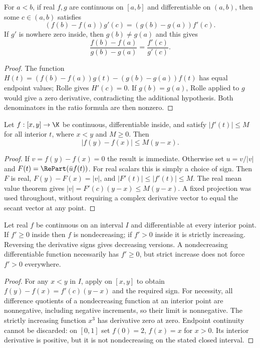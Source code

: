 \begin{theorem}
For $a<b$, if real $f,g$ are continuous on $[a,b]$ and differentiable on $(a,b)$, then some $c\in(a,b)$ satisfies
\[ (f(b)-f(a))g'(c)=(g(b)-g(a))f'(c). \]
If $g'$ is nowhere zero inside, then $g(b)\ne g(a)$ and this gives
\[ \frac{f(b)-f(a)}{g(b)-g(a)}=\frac{f'(c)}{g'(c)}. \]
\end{theorem}
\begin{proof}
The function $H(t)=(f(b)-f(a))g(t)-(g(b)-g(a))f(t)$ has equal endpoint values; Rolle gives $H'(c)=0$. If $g(b)=g(a)$, Rolle applied to $g$ would give a zero derivative, contradicting the additional hypothesis. Both denominators in the ratio formula are then nonzero.
\end{proof}

\begin{theorem}
Let $f:[x,y]\to\K$ be continuous, differentiable inside, and satisfy $|f'(t)|\le M$ for all interior $t$, where $x<y$ and $M\ge0$. Then
\[ |f(y)-f(x)|\le M(y-x). \]
\end{theorem}
\begin{proof}
If $v=f(y)-f(x)=0$ the result is immediate. Otherwise set $u=v/|v|$ and $F(t)=\RePart(\bar u f(t))$. For real scalars this is simply a choice of sign. Then $F$ is real, $F(y)-F(x)=|v|$, and $|F'(t)|\le|f'(t)|\le M$. The real mean value theorem gives $|v|=F'(c)(y-x)\le M(y-x)$. A fixed projection was used throughout, without requiring a complex derivative vector to equal the secant vector at any point.
\end{proof}

\begin{theorem}
Let real $f$ be continuous on an interval $I$ and differentiable at every interior point. If $f'\ge0$ inside then $f$ is nondecreasing; if $f'>0$ inside it is strictly increasing. Reversing the derivative signs gives decreasing versions. A nondecreasing differentiable function necessarily has $f'\ge0$, but strict increase does not force $f'>0$ everywhere.
\end{theorem}
\begin{proof}
For any $x<y$ in $I$, apply  on $[x,y]$ to obtain $f(y)-f(x)=f'(c)(y-x)$ and the required sign. For necessity, all difference quotients of a nondecreasing function at an interior point are nonnegative, including negative increments, so their limit is nonnegative. The strictly increasing function $x^3$ has derivative zero at zero. Endpoint continuity cannot be discarded: on $[0,1]$ set $f(0)=2$, $f(x)=x$ for $x>0$. Its interior derivative is positive, but it is not nondecreasing on the stated closed interval.
\end{proof}

